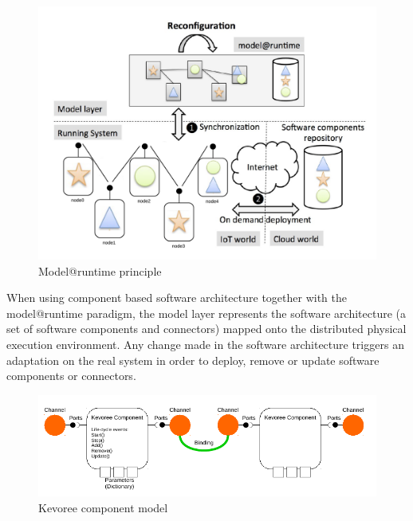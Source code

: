 \begin{figure}[htb]
	\centering
	\includegraphics[width=0.95\columnwidth]{chapters/calpulli.images/MAR_Overview2.pdf}
	\caption{Model@runtime principle} \label{fig:MAROverview2}
\end{figure}

When using component based software architecture together with the model@runtime paradigm, the model layer represents the software architecture (a set of software components and connectors) mapped onto the distributed physical execution environment.
Any change made in the software architecture triggers an adaptation on the real system in order to deploy, remove or update software components or connectors.   

\begin{figure}[htb]
	\centering
	\includegraphics[width=0.95\columnwidth]{chapters/calpulli.images/componentModel.pdf}
	\caption{Kevoree component model} \label{fig:kevCompModel}
\end{figure}

